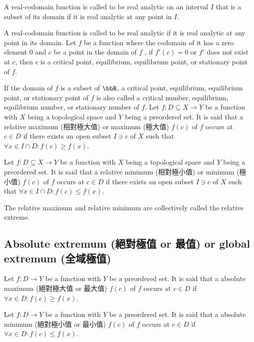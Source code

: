 \documentclass[a4paper,12pt]{report}
\begin{document}
\begin{itemize}
\begin{itemize}
A real-codomain function is called to be real analytic on an interval $I$ that is a subset of its domain if it is real analytic at any point in $I$.

A real-codomain function is called to be real analytic if it is real analytic at any point in its domain.
Let $f$ be a function where the codomain of it has a zero element $0$ and \( c \) be a point in the domain of $f$ , if \( f'(c) = 0 \) or \( f' \) does not exist at \( c \), then \( c \) is a critical point, equilibrium, equilibrium point, or stationary point of \( f \).

If the domain of $f$ is a subset of $\bbR$, a critical point, equilibrium, equilibrium point, or stationary point of \( f \) is also called a critical number, equilibrium, equilibrium number, or stationary number of \( f \).
Let $f\colon D\subseteq X\to Y$ be a function with $X$ being a topological space and $Y$ being a preordered set. It is said that a relative maximum (相對極大值) or maximum (極大值) \( f(c) \) of \(f\) occurs at $c\in D$ if there exists an open subset $I\ni c$ of $X$ such that \( \forall x\in I\cap D\colon f(c) \geq f(x) \).

Let $f\colon D\subseteq X\to Y$ be a function with $X$ being a topological space and $Y$ being a preordered set. It is said that a relative minimum (相對極小值) or minimum (極小值) \( f(c) \) of \(f\) occurs at $c\in D$ if there exists an open subset $I\ni c$ of $X$ such that \( \forall x\in I\cap D\colon f(c) \leq f(x) \).

The relative maximum and relative minimum are collectively called the relative extreme.
\subsection{Absolute extremum (絕對極值 or 最值) or global extremum (全域極值)}
Let $f\colon D\to Y$ be a function with $Y$ be a preordered set. It is said that a absolute maximum (絕對極大值 or 最大值) \( f(c) \) of \(f\) occurs at $c\in D$ if \( \forall x\in D\colon f(c) \geq f(x) \).

Let $f\colon D\to Y$ be a function with $Y$ be a preordered set. It is said that a absolute minimum (絕對極小值 or 最小值) \( f(c) \) of \(f\) occurs at $c\in D$ if \( \forall x\in D\colon f(c) \leq f(x) \).


\end{itemize}
\end{itemize}
\end{document}
